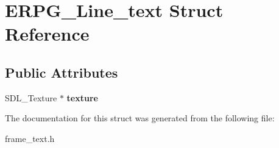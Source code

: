 \hypertarget{structERPG__Line__text}{\section{E\-R\-P\-G\-\_\-\-Line\-\_\-text Struct Reference}
\label{structERPG__Line__text}
}
\subsection*{Public Attributes}
\begin{DoxyCompactItemize}
\item 
\hypertarget{structERPG__Line__text_a0b56f895a48c6e892d85b238c0da2455}{S\-D\-L\-\_\-\-Texture $\ast$ {\bfseries texture}}\label{structERPG__Line__text_a0b56f895a48c6e892d85b238c0da2455}

\end{DoxyCompactItemize}


The documentation for this struct was generated from the following file\-:\begin{DoxyCompactItemize}
\item 
frame\-\_\-text.\-h\end{DoxyCompactItemize}
